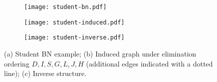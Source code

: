 \begin{figure}[t]
    \centering
    \begin{subfigure}[b]{0.32\textwidth}
        \centering
        \texttt{[image: student-bn.pdf]}
        \caption{}
        \label{fig:student-bn}
    \end{subfigure}
    \begin{subfigure}[b]{0.32\textwidth}
        \centering
        \texttt{[image: student-induced.pdf]}
        \caption{}
        \label{fig:student-induced}
    \end{subfigure}
    \begin{subfigure}[b]{0.32\textwidth}
        \centering
        \texttt{[image: student-inverse.pdf]}
        \caption{}
        \label{fig:student-inverse}
    \end{subfigure}
    \caption{
    (a) Student BN example; 
    (b) Induced graph under elimination ordering $D,I,S,G,L,J,H$ (additional edges indicated with a dotted line); 
    (c) Inverse structure.
\vspace{-10pt}}
    \label{fig:student-example}
\end{figure}
